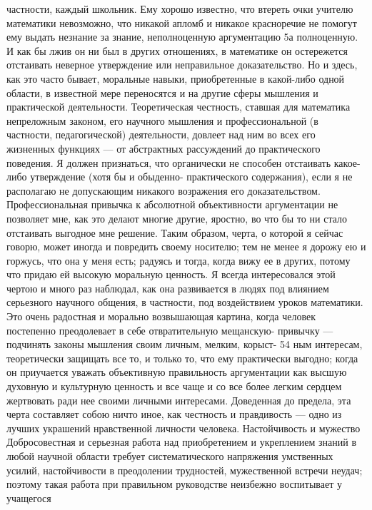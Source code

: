 \documentclass[12pt, a4paper, openany]{book}
\begin{document}
частности, каждый школьник. Ему хорошо известно, что  
втереть очки учителю математики невозможно, что никакой 
апломб и никакое красноречие не помогут ему выдать 
незнание за знание, неполноценную аргументацию 5а 
полноценную. И как бы лжив он ни был в других  
отношениях, в математике он остережется отстаивать неверное 
утверждение или неправильное доказательство. 
Но и здесь, как это часто бывает, моральные навыки, 
приобретенные в какой-либо одной области, в известной 
мере переносятся и на другие сферы мышления и  
практической деятельности. Теоретическая честность, ставшая для 
математика непреложным законом, его научного  
мышления и профессиональной (в частности, педагогической) 
деятельности, довлеет над ним во всех его жизненных 
функциях — от абстрактных рассуждений до  
практического поведения. 
Я должен признаться, что органически не способен 
отстаивать какое-либо утверждение (хотя бы и обыденно- 
практического содержания), если я не располагаю не 
допускающим никакого возражения его доказательством. 
Профессиональная привычка к абсолютной объективности 
аргументации не позволяет мне, как это делают многие 
другие, яростно, во что бы то ни стало отстаивать  
выгодное мне решение. Таким образом, черта, о которой я  
сейчас говорю, может иногда и повредить своему носителю; 
тем не менее я дорожу ею и горжусь, что она у меня есть; 
радуясь и тогда, когда вижу ее в других, потому что  
придаю ей высокую моральную ценность. 
Я всегда интересовался этой чертою и много раз  
наблюдал, как она развивается в людях под влиянием  
серьезного научного общения, в частности, под воздействием 
уроков математики. Это очень радостная и морально  
возвышающая картина, когда человек постепенно  
преодолевает в себе отвратительную мещанскую- привычку —  
подчинять законы мышления своим личным, мелким, корыст- 
54 
ным интересам, теоретически защищать все то, и только 
то, что ему практически выгодно; когда он приучается 
уважать объективную правильность аргументации как 
высшую духовную и культурную ценность и все чаще 
и со все более легким сердцем жертвовать ради нее  
своими личными интересами. Доведенная до предела, эта 
черта составляет собою ничто иное, как честность и  
правдивость — одно из лучших украшений нравственной  
личности человека. 
Настойчивость и мужество 
Добросовестная и серьезная работа над приобретением 
и укреплением знаний в любой научной области требует 
систематического напряжения умственных усилий,  
настойчивости в преодолении трудностей, мужественной 
встречи неудач; поэтому такая работа при правильном 
руководстве неизбежно воспитывает у учащегося  
\end{document}
